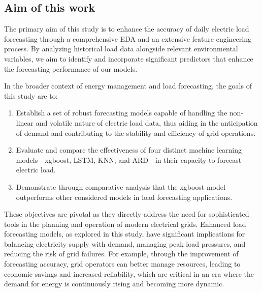 \documentclass{article} %
\begin{document}
\subsection{Aim of this work}
The primary aim of this study is to enhance the accuracy of daily electric load forecasting through a comprehensive \gls*{EDA} and an extensive feature engineering process. By analyzing historical load data alongside relevant environmental variables, we aim to identify and incorporate significant predictors that enhance the forecasting performance of our models.

In the broader context of energy management and load forecasting, the goals of this study are to:

\begin{enumerate}
    \item Establish a set of robust forecasting models capable of handling the non-linear and volatile nature of electric load data, thus aiding in the anticipation of demand and contributing to the stability and efficiency of grid operations.
    \item Evaluate and compare the effectiveness of four distinct machine learning models - \gls{xgboost}, \gls{LSTM}, \gls{KNN}, and \gls{ARD} - in their capacity to forecast electric load.
    \item Demonstrate through comparative analysis that the \gls{xgboost} model outperforms other considered models in load forecasting applications.
\end{enumerate}

These objectives are pivotal as they directly address the need for sophisticated tools in the planning and operation of modern electrical grids. Enhanced load forecasting models, as explored in this study, have significant implications for balancing electricity supply with demand, managing peak load pressures, and reducing the risk of grid failures. For example, through the improvement of forecasting accuracy, grid operators can better manage resources, leading to economic savings and increased reliability, which are critical in an era where the demand for energy is continuously rising and becoming more dynamic.
\end{document}
